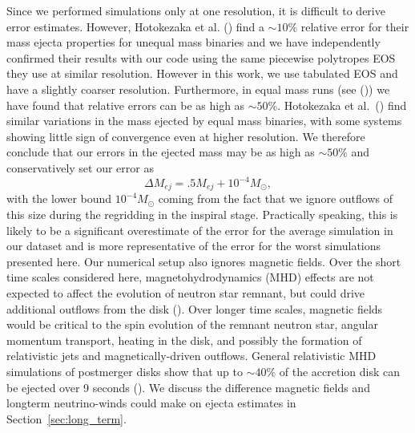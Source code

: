 Since we performed simulations only at one resolution, it is difficult to derive error estimates. However, Hotokezaka et al. (\citet*{hotokezaka:13}) find a $\sim 10\%$ relative error for their mass ejecta properties for unequal mass binaries and we have independently confirmed their results with our code using the same piecewise polytropes EOS they use at similar resolution. However in this work, we use tabulated EOS and have a slightly coarser resolution. Furthermore, in equal mass runs (see (\citet*{foucart:2015gaa})) we have found that relative errors can be as high as $\sim 50\%$. Hotokezaka et al.~(\citet*{hotokezaka:13}) find similar variations in the mass ejected by equal mass binaries, with some systems showing little sign of convergence even at higher resolution. We therefore conclude that our errors in the ejected mass may be as high as $\sim 50\%$ and conservatively set our error as
%
\begin{equation}
\label{eqn:error}
  \Delta M_{ej} = .5M_{ej} + 10^{-4}M_\odot,
\end{equation}
%
with the lower bound $10^{-4}M_\odot$ coming from the fact that we ignore outflows of this size during the regridding in the inspiral stage. Practically speaking, this is likely to be a significant overestimate of the error for the average simulation in our dataset and is more representative of the error for the worst simulations presented here. %
Our numerical setup also ignores magnetic fields. Over the short time scales considered here, magnetohydrodynamics (MHD) effects are not expected to affect the evolution of neutron star remnant, but could drive additional outflows from the disk (\citet*{kiuchi2014,neilsen2014magnetized}). Over longer time scales, magnetic fields would be critical to the spin evolution of the remnant neutron star, angular momentum transport, heating in the disk, and possibly the formation of relativistic jets and magnetically-driven outflows. General relativistic MHD simulations of postmerger disks show
that up to $\sim 40\%$ of the accretion disk 
can be ejected over 9 seconds (\citet*{fernandez2019long}). We 
discuss the difference magnetic fields and longterm neutrino-winds could make on ejecta estimates in Section~\ref{sec:long_term}.

